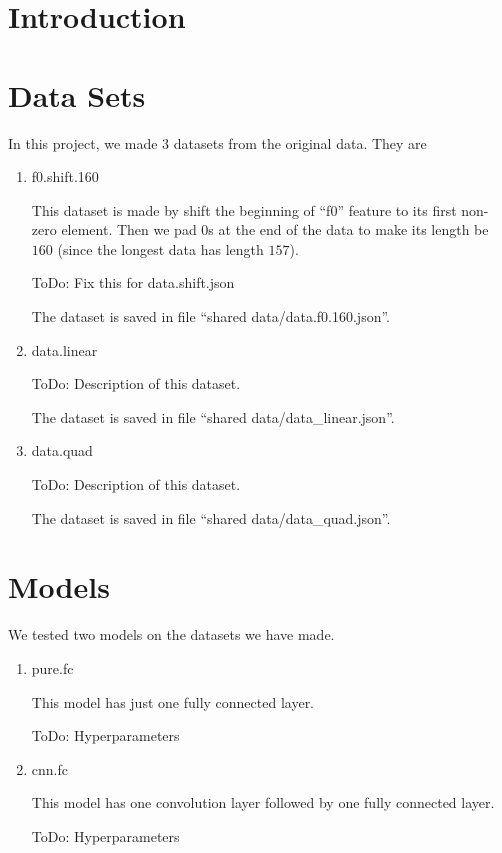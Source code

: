\documentclass[a4paper]{article}
\begin{document}
\maketitle
\pagebreak

\section{Introduction}
\section{Data Sets}

In this project, we made $3$ datasets from the original data. They are
\begin{enumerate}
\item f0.shift.160

	This dataset is made by shift the beginning of ``f0'' feature to its first non-zero element. Then we pad $0$s at the end of the data to make its length be $160$ (since the longest data has length $157$).

	ToDo: Fix this for data.shift.json

	The dataset is saved in file ``shared data/data.f0.160.json''.
\item data.linear

	ToDo: Description of this dataset.

	The dataset is saved in file ``shared data/data\_linear.json''.

\item data.quad
	
	ToDo: Description of this dataset.

	The dataset is saved in file ``shared data/data\_quad.json''.

\end{enumerate}

\section{Models}

We tested two models on the datasets we have made.
\begin{enumerate}
\item pure.fc

	This model has just one fully connected layer.

	ToDo: Hyperparameters

\item cnn.fc

	This model has one convolution layer followed by one fully connected layer.

	ToDo: Hyperparameters
\end{enumerate}
\end{document}
